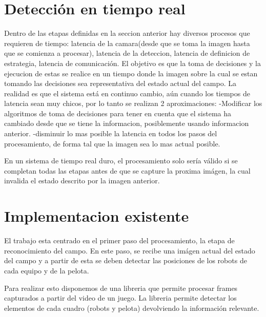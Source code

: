 \documentclass[a4paper,10pt]{report}
\begin{document}
\section{Detección en tiempo real}
Dentro de las etapas definidas en la seccion anterior hay diversos procesos que requieren de tiempo: latencia de la camara(desde que se toma la imagen hasta que se comienza a procesar),
latencia de la deteccion, latencia de definicion de estrategia, latencia de comunicación.
El objetivo es que la toma de decisiones y la ejecucion de estas se realice en un tiempo donde la imagen sobre la cual se estan tomando las decisiones sea representativa del estado actual del campo.
La realidad es que el sistema está en continuo cambio, aún cuando los tiempos de latencia sean muy chicos, por lo tanto se realizan 2 aproximaciones: 
-Modificar los algoritmos de toma de decisiones para tener en cuenta que el sistema ha cambiado desde que se tiene la informacion, posiblemente usando informacion anterior.
-disminuir lo mas posible la latencia en todos los pasos del procesamiento, de forma tal que la imagen sea lo mas actual posible.

En un sistema de tiempo real duro, el procesamiento solo sería válido si se completan todas las etapas antes de que se capture la proxima imágen, la cual invalida el estado descrito por la imagen anterior.

\section{Implementacion existente}

El trabajo esta centrado en el primer paso del procesamiento, la etapa de reconocimiento del campo. 
En este paso, se recibe una imágen actual del estado del campo y a partir de esta se deben detectar las posiciones de los robots de cada equipo y de la pelota.

Para realizar esto disponemos de una libreria que permite procesar frames capturados a partir del video de un juego. 
La libreria permite detectar los elementos de cada cuadro (robots y pelota) devolviendo la información relevante. 
\end{document}
